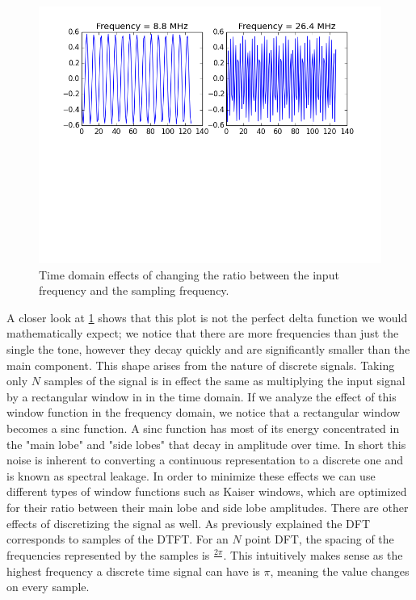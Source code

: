 \documentclass{article}
\begin{document}
\begin{figure}[h!]
\centering
\includegraphics[scale=0.7]{sampling_time_ext.png}
\caption{Time domain effects of changing the ratio between the input frequency and the sampling frequency.}
\label{fig:sampling_f_ext}
\end{figure}

  A closer look at \ref{fig:sampling_f_ext} shows that this plot is not the perfect delta function we would mathematically expect; we notice that there are more frequencies than just the single the tone, however they decay quickly and are significantly smaller than the main component.  This shape arises from the nature of discrete signals. Taking only $N$ samples of the signal is in effect the same as multiplying the input signal by a rectangular window in in the time domain.  If we analyze the effect of this window function in the frequency domain, we notice that a rectangular window becomes a sinc function.  A sinc function has most of its energy concentrated in the "main lobe" and "side lobes" that decay in amplitude over time. In short this noise is inherent to converting a continuous representation to a discrete one and is known as spectral leakage.  In order to minimize these effects we can use different types of window functions such as Kaiser windows, which are optimized for their ratio between their main lobe and side lobe amplitudes. 
  There are other effects of discretizing the signal as well. As previously explained the DFT corresponds to samples of the DTFT.  For an $N$ point DFT, the spacing of the frequencies represented by the samples is $\frac{2\pi}{}$.  This intuitively makes sense as the highest frequency a discrete time signal can have is $\pi$, meaning the value changes on every sample.
  
\end{document}
